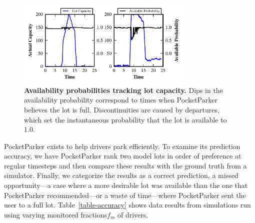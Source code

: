 \documentclass{sigchi}
\begin{document}
\begin{figure}[t]
\centering
\includegraphics[width=3.325in]{./simulator/figures/tracking_fastfill_horizontal.pdf}

\caption{\textbf{Availability probabilities tracking lot capacity.} Dips in
the availability probability correspond to times when PocketParker believes
the lot is full. Discontinuities are caused by departures, which set the
instantaneous probability that the lot is available to 1.0.}

\label{fig-trackingexample}
\end{figure}
PocketParker exists to help drivers park efficiently.  To examine its
prediction accuracy, we have PocketParker rank two model lots in order of
preference at regular timesteps and then compare these results with the ground
truth from a simulator.  Finally, we categorize the results as a correct
prediction, a missed opportunity---a case where a more desirable lot was
available than the one that PocketParker recommended---or a waste of
time---where PocketParker sent the user to a full lot.
Table~\ref{table-accuracy} shows data results from simulations run using
varying monitored fractions$f_m$ of drivers.
\end{document}
